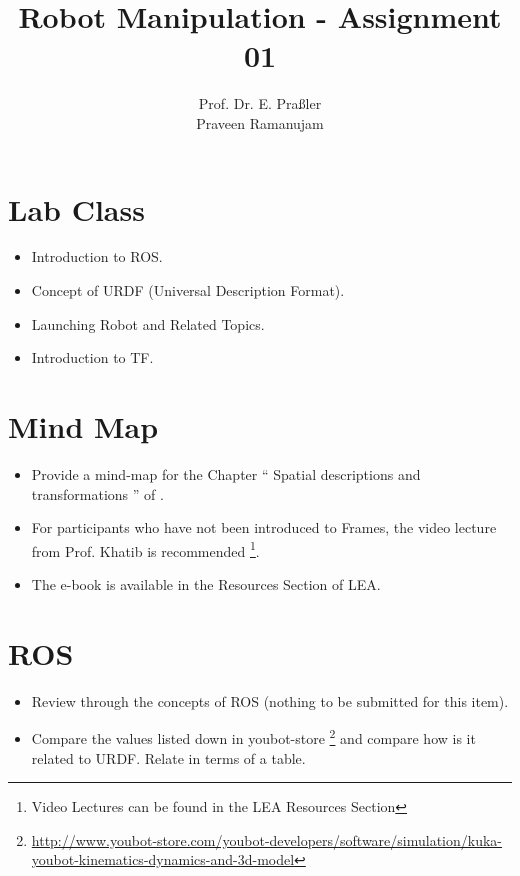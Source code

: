 \documentclass[a4paper,10pt]{article}
\date{\displaydate{date}}
\title{Robot Manipulation - Assignment 01}
\author{Prof. Dr. E. Pra{\ss}ler \\Praveen Ramanujam}
\begin{document}
\maketitle


\section{Lab Class}
\begin{itemize}
 \item Introduction to ROS.
 \item Concept of URDF (Universal Description Format).
 \item Launching Robot and Related Topics.
 \item Introduction to TF.
\end{itemize}



\section{Mind Map}
\begin{itemize}
 \item Provide a mind-map for the Chapter `` Spatial descriptions and transformations
 '' of \cite{Craig}.
 \item For participants who have not been introduced to Frames, the video lecture from Prof. Khatib is recommended
 \footnote{Video Lectures can be found in the LEA Resources Section}.
 \item The e-book is available in the Resources Section of LEA.
\end{itemize}


\section{ROS}
\begin{itemize}
 \item Review through the concepts of ROS (nothing to be submitted for this item). 
 \item Compare the values listed down in youbot-store \footnote{\url{http://www.youbot-store.com/youbot-developers/software/simulation/kuka-youbot-kinematics-dynamics-and-3d-model}}
and compare how is it related to URDF. Relate in terms of a table.
\end{itemize}



\end{document}

